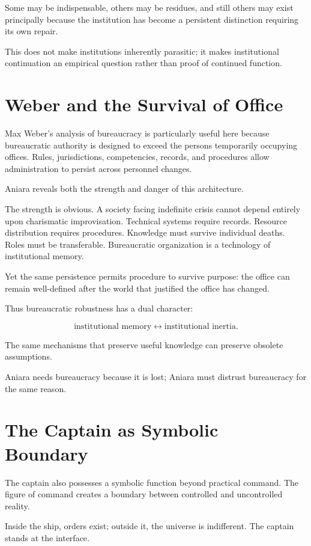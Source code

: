 \documentclass[11pt,oneside]{book}
\theoremstyle{definition}
\theoremstyle{remark}
\begin{document}
Some may be indispensable, others may be residues, and still others may exist principally because the institution has become a persistent distinction requiring its own repair.

This does not make institutions inherently parasitic; it makes institutional continuation an empirical question rather than proof of continued function.

\section{Weber and the Survival of Office}

Max Weber's analysis of bureaucracy is particularly useful here because bureaucratic authority is designed to exceed the persons temporarily occupying offices. Rules, jurisdictions, competencies, records, and procedures allow administration to persist across personnel changes.

Aniara reveals both the strength and danger of this architecture.

The strength is obvious. A society facing indefinite crisis cannot depend entirely upon charismatic improvisation. Technical systems require records. Resource distribution requires procedures. Knowledge must survive individual deaths. Roles must be transferable. Bureaucratic organization is a technology of institutional memory.

Yet the same persistence permits procedure to survive purpose: the office can remain well-defined after the world that justified the office has changed.

Thus bureaucratic robustness has a dual character:

\[
\text{institutional memory}
\leftrightarrow
\text{institutional inertia}.
\]

The same mechanisms that preserve useful knowledge can preserve obsolete assumptions.

Aniara needs bureaucracy because it is lost; Aniara must distrust bureaucracy for the same reason.

\section{The Captain as Symbolic Boundary}

The captain also possesses a symbolic function beyond practical command. The figure of command creates a boundary between controlled and uncontrolled reality.

Inside the ship, orders exist; outside it, the universe is indifferent. The captain stands at the interface.
\end{document}
